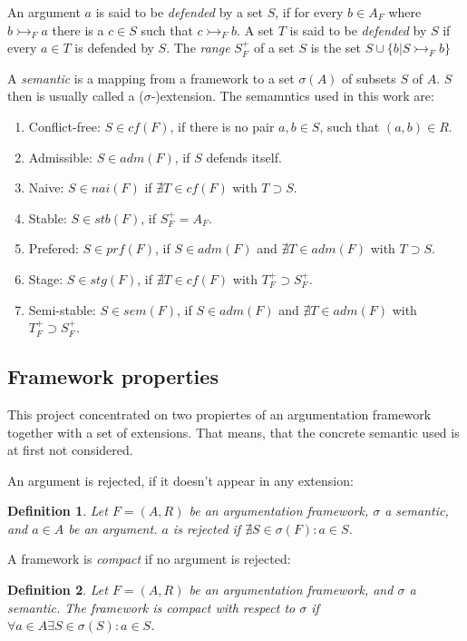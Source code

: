 \documentclass{scrartcl}
\newtheorem{definition}{Definition}
\begin{document}
 An argument $a$ is said to be
\emph{defended} by a set $S$, if for every $b \in A_F$ where $b \rightarrowtail_F a$
there is a $c \in S$ such that $c \rightarrowtail_F b$. A set $T$ is said to be \emph{defended}
by $S$ if every $a \in T$ is defended by $S$. The \emph{range} $S_F^{+}$ of a
set $S$ is the set $S \cup\{b | S \rightarrowtail_F b\}$

A \emph{semantic} is a mapping from a framework to a set $\sigma(A)$ of subsets $S$ of $A$.
$S$ then is usually called a ($\sigma$-)extension. The semamntics used in this
work are:
\begin{enumerate}
  \item Conflict-free: $S \in cf(F)$, if there is no pair $a,b \in S$, such that $(a,b) \in R$.
  \item Admissible: $S \in adm(F)$, if $S$ defends itself.
  \item Naive: $S \in nai(F)$ if $\nexists T\in cf(F)$ with $T \supset S$.
  \item Stable: $S \in stb(F)$, if $S_F^{+} = A_F$.
  \item Prefered: $S \in prf(F)$, if $S \in adm(F)$ and $\nexists T\in adm(F)$ with $T \supset S$.
  \item Stage: $S \in stg(F)$, if $\nexists T\in cf(F)$ with $T_F^{+} \supset S_F^{+}$.
  \item Semi-stable: $S \in sem(F)$, if $S \in adm(F)$ and $\nexists T\in adm(F)$ with
          $T_F^{+} \supset S_F^{+}$.
\end{enumerate}

\subsection{Framework properties}

This project concentrated on two propiertes of an argumentation framework
together with a set of extensions. That means, that the concrete semantic
used is at first not considered.

An argument is rejected, if it doesn't appear in any extension:
\begin{definition}
Let $F=(A,R)$ be an argumentation framework, $\sigma$ a semantic, and $a\in A$ be an
argument. $a$ is \emph{rejected} if $\nexists S\in\sigma(F): a\in S$.
\end{definition}

A framework is \emph{compact} if no argument is rejected:
\begin{definition}
Let $F=(A,R)$ be an argumentation framework, and $\sigma$ a semantic.
The framework is \emph{compact} with respect to $\sigma$ if $\forall a\in A\exists
S\in\sigma(S):a\in S$.
\end{definition}
\end{document}
